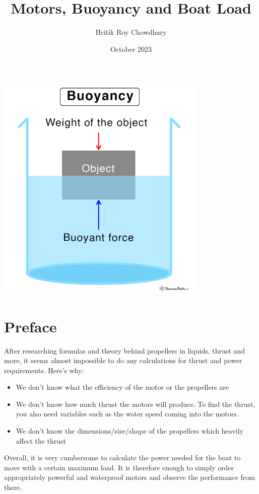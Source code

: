 \documentclass{article}
\title{Motors, Buoyancy and Boat Load}
\author{Hritik Roy Chowdhury}
\date{October 2023}
\begin{document}
\maketitle

\vspace{2cm}
\begin{center}
    \includegraphics[width=0.75\textwidth]{Buoyancy.jpg}
\end{center}

\newpage

\section*{Preface}
After researching formulas and theory behind propellers in liquids, thrust and more, it seems almost impossible to do any calculations for thrust and power requirements. Here's why:
\begin{itemize}
    \item We don't know what the efficiency of the motor or the propellers are
    \item We don't know how much thrust the motors will produce. To find the thrust, you also need variables such as the water speed coming into the motors.
    \item We don't know the dimensions/size/shape of the propellers which heavily affect the thrust
\end{itemize}
Overall, it is very cumbersome to calculate the power needed for the boat to move with a certain maximum load. It is therefore enough to simply order appropriately powerful and waterproof motors and observe the performance from there. \\
\end{document}
